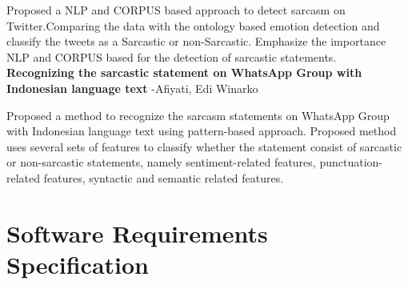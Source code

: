 \documentclass[oneside,a4paper,12pt]{book}
\begin{document}
\par 
Proposed a NLP and CORPUS based approach to detect sarcasm on Twitter.Comparing the data with the ontology based emotion detection and classify the tweets as a Sarcastic or non-Sarcastic. Emphasize the importance NLP and CORPUS based for the detection of sarcastic statements. \\
\textbf{Recognizing the sarcastic statement on WhatsApp Group with Indonesian language text} -Afiyati, Edi Winarko
\par Proposed a method to recognize the sarcasm statements on WhatsApp Group with Indonesian language text using pattern-based approach. Proposed method uses several sets of features to classify whether the statement consist of sarcastic or non-sarcastic statements, namely sentiment-related features, punctuation-related features, syntactic and semantic related features.
\chapter{Software Requirements Specification}
\end{document}
